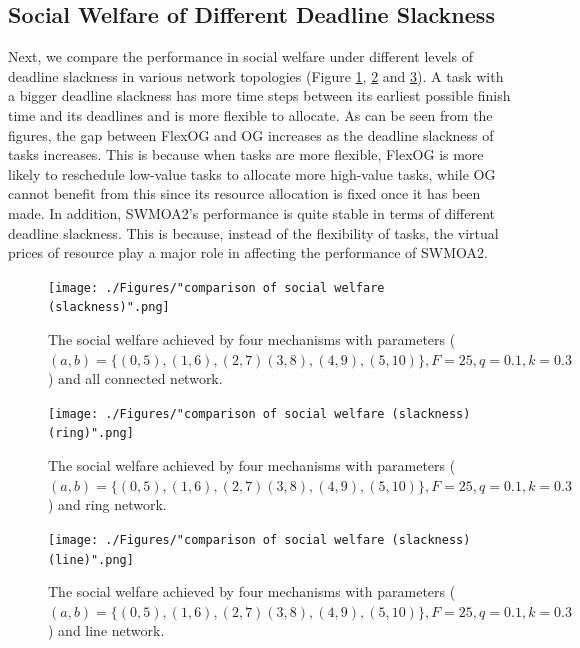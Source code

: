 \documentclass[11pt]{phdthesis}
\begin{document}
\subsection{Social Welfare of Different Deadline Slackness}

Next, we compare the performance in social welfare under different levels of deadline slackness in various network topologies (Figure \ref{fig: social_welfare_deadline_slackeness}, \ref{fig: social_welfare_deadline_slackeness_ring} and \ref{fig: social_welfare_deadline_slackeness_line}). A task with a bigger deadline slackness has more time steps between its earliest possible finish time and its deadlines and is more flexible to allocate. As can be seen from the figures, the gap between FlexOG and OG increases as the deadline slackness of tasks increases. This is because when tasks are more flexible, FlexOG is more likely to reschedule low-value tasks to allocate more high-value tasks, while OG cannot benefit from this since its resource allocation is fixed once it has been made. In addition, SWMOA2's performance is quite stable in terms of different deadline slackness. This is because, instead of the flexibility of tasks, the virtual prices of resource play a major role in affecting the performance of SWMOA2.

\begin{figure}[h]
    \centering
    \texttt{[image: ./Figures/"comparison of social welfare (slackness)".png]}
    \caption{The social welfare achieved by four mechanisms with parameters ($ (a, b) = \{ (0, 5), (1, 6), (2,7) (3, 8),(4, 9), (5, 10) \}, F=25, q=0.1, k=0.3 $) and all connected network.}
    \label{fig: social_welfare_deadline_slackeness}
\end{figure}

\begin{figure}[h]
    \centering
    \texttt{[image: ./Figures/"comparison of social welfare (slackness) (ring)".png]}
    \caption{The social welfare achieved by four mechanisms with parameters ($ (a, b) = \{ (0, 5), (1, 6), (2,7) (3, 8),(4, 9), (5, 10) \}, F=25, q=0.1, k=0.3 $) and ring network.}
    \label{fig: social_welfare_deadline_slackeness_ring}
\end{figure}

\begin{figure}[h]
    \centering
    \texttt{[image: ./Figures/"comparison of social welfare (slackness) (line)".png]}
    \caption{The social welfare achieved by four mechanisms with parameters ($ (a, b) = \{ (0, 5), (1, 6), (2,7) (3, 8),(4, 9), (5, 10) \}, F=25, q=0.1, k=0.3 $) and line network.}
    \label{fig: social_welfare_deadline_slackeness_line}
\end{figure}
\end{document}
